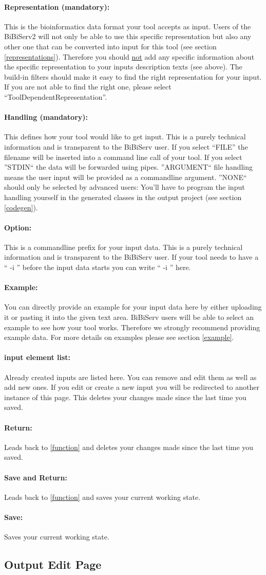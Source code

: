 \documentclass[a4paper,10pt]{book}
\newcommand{\buttonsDetail}[1]{
\paragraph{Return:} Leads back to #1 and deletes your changes made since the last time you saved.
\paragraph{Save and Return:} Leads back to #1 and saves your current working state.
\paragraph{Save:} Saves your current working state.
}
\newcommand{\newElem}[2]{
\paragraph{#1 element list:} Already created #1s are listed here. You can remove and edit them as well as add new ones. If you edit or create a new #1 you will be redirected to #2. This deletes your changes made since the last time you saved.
}
\begin{document}
\paragraph{Representation (mandatory):} This is the bioinformatics data format your tool accepts as input. Users of the BiBiServ2 will not only be able to use this specific representation but also any other one that can be converted into input for this tool (see section \ref{representations}). Therefore you should \underline{not} add any specific information about the specific representation to your inputs description texts (see above). The build-in filters should make it easy to find the right representation for your input. If you are not able to find the right one, please select ``ToolDependentRepresentation''.
\paragraph{Handling (mandatory):} This defines how your tool would like to get input. This is a purely technical information and is transparent to the BiBiServ user. If you select ``FILE'' the filename will be inserted into a command line call of your tool. If you select ''STDIN`` the data will be forwarded using pipes. ''ARGUMENT`` file handling means the user input will be provided as a commandline argument. ''NONE`` should only be selected by advanced users: You'll have to program the input handling yourself in the generated classes in the output project (see section \ref{codegen}).
\paragraph{Option:} This is a commandline prefix for your input data. This is a purely technical information and is transparent to the BiBiServ user. If your tool needs to have a `` -i '' before the input data starts you can write `` -i '' here.
\paragraph{Example:} You can directly provide an example for your input data here by either uploading it or pasting it into the given text area. BiBiServ users will be able to select an example to see how your tool works. Therefore we strongly recommend providing example data. For more details on examples please see section \ref{example}.
\newElem{input}{another instance of this page}
\buttonsDetail{\ref{function}}

\subsection{Output Edit Page}
\label{outputs}
\end{document}
